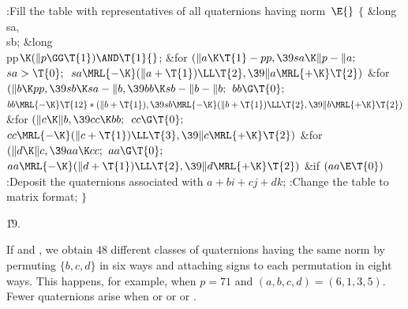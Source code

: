 \Y\B\4:Fill the  table with representatives of all quaternions
having norm~\X${}\E{}$\6
${}\{{}$\5
\1\&{long} \\{sa}${},{}$ \\{sb};\6
\&{long} \\{pp}${}\K(\|p\GG\T{1})\AND\T{1}{}$;\7
\&{for} ${}(\|a\K\T{1}-\\{pp},\39\\{sa}\K\|p-\|a;{}$ ${}\\{sa}>\T{0};{}$ ${}%
\\{sa}\MRL{-{\K}}(\|a+\T{1})\LL\T{2},\39\|a\MRL{+{\K}}\T{2}){}$\1\6
\&{for} ${}(\|b\K\\{pp},\39\\{sb}\K\\{sa}-\|b,\39\\{bb}\K\\{sb}-\|b-\|b;{}$ ${}%
\\{bb}\G\T{0};{}$ ${}\\{bb}\MRL{-{\K}}\T{12}*(\|b+\T{1}),\39\\{sb}\MRL{-{\K}}(%
\|b+\T{1})\LL\T{2},\39\|b\MRL{+{\K}}\T{2}){}$\1\6
\&{for} ${}(\|c\K\|b,\39\\{cc}\K\\{bb};{}$ ${}\\{cc}\G\T{0};{}$ ${}\\{cc}%
\MRL{-{\K}}(\|c+\T{1})\LL\T{3},\39\|c\MRL{+{\K}}\T{2}){}$\1\6
\&{for} ${}(\|d\K\|c,\39\\{aa}\K\\{cc};{}$ ${}\\{aa}\G\T{0};{}$ ${}\\{aa}%
\MRL{-{\K}}(\|d+\T{1})\LL\T{2},\39\|d\MRL{+{\K}}\T{2}){}$\1\6
\&{if} ${}(\\{aa}\E\T{0}){}$\1\5
:Deposit the quaternions associated with $a+bi+cj+dk$\X;\2\2\2\2\2\6
:Change the  table to matrix format\X;\6
\4${}\}{}$\2\par
\U19.\fi

If  and , we obtain 48 different
classes of quaternions
having the same norm by permuting $\{b,c,d\}$ in six ways and attaching
signs to each permutation in eight ways. This happens, for example,
when $p=71$ and $(a,b,c,d)=(6,1,3,5)$. Fewer quaternions arise when
 or  or  or .

